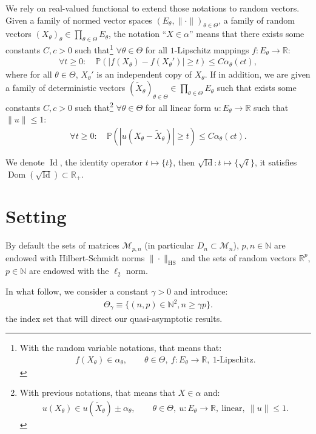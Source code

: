 \documentclass[ECP, preprint]{ejpecp} %
\DeclareMathOperator{\dom}{Dom}
\DeclareMathOperator{\id}{Id}
\DeclareMathOperator{\hs}{HS}
\begin{document}
We rely on real-valued functional to extend those notations to random vectors. Given a family of normed vector spaces $(E_\theta,\|\cdot\|)_{\theta\in \Theta}$, a family of random vectors $(X_\theta)_\theta\in \prod_{\theta\in \Theta} E_\theta$, the notation ``$X\in \alpha$'' means that there exists some constants $C,c>0$ such that\footnote{With the random variable notations, that means that:
\begin{align*}
    f(X_\theta) \in \alpha_\theta, \qquad \theta\in \Theta, \ f:E_\theta \to \mathbb R, \ 1\text{-Lipschitz}.
\end{align*}} $\forall \theta\in \Theta$ for all $1$-Lipschitz mappings $f: E_\theta \to \mathbb R$:
\begin{align*}
    \forall t\geq 0:\quad \mathbb P(|f(X_\theta) - f(X_\theta')|\geq t) \leq C\alpha_\theta(ct),
\end{align*}
where for all $\theta \in \Theta$, $X_\theta'$ is an independent copy of $X_\theta$. If in addition, we are given a family of deterministic vectors $(\tilde X_\theta)_{\theta \in \Theta} \in \prod_{\theta\in \Theta} E_\theta$ such that exists some constants $C,c>0$ such that\footnote{With previous notations, that means that $X \in \alpha$ and:
\begin{align*}
    u(X_\theta) \in u(\tilde X_\theta) \pm \alpha_\theta, \qquad \theta\in \Theta, \ u:E_\theta \to \mathbb R, \ \text{linear}, \ \|u\| \leq 1.
\end{align*}} $\forall \theta\in \Theta$ for all linear form $u: E_\theta \to \mathbb R$ such that $\|u\|\leq 1$:
\begin{align*}
    \forall t\geq 0:\quad \mathbb P(|u(X_\theta - \tilde X_\theta)|\geq t) \leq C\alpha_\theta(ct).
\end{align*}

We denote $\id$, the identity operator $t\mapsto \{t\}$, then $\sqrt{\id}:t\mapsto \{\sqrt{t}\}$, it satisfies $\dom(\sqrt{\id})\subset \mathbb R_+$.

\section{Setting}
By default the sets of matrices $\mathcal{M}_{p,n}$ (in particular $D_n\subset \mathcal{M}_{n}$), $p,n\in \mathbb N$ are endowed with Hilbert-Schmidt norms $\|\cdot \|_{\hs}$ and the sets of random vectors $\mathbb R^p$, $p\in \mathbb N$ are endowed with the $\ell_2$ norm. 

In what follow, we consider a constant $\gamma>0$ and introduce:
\begin{align*}
    \Theta_{\gamma} \equiv \{(n,p) \in \mathbb N^2, n\geq \gamma p\}.
\end{align*}
the index set that will direct our quasi-asymptotic results.
\end{document}
